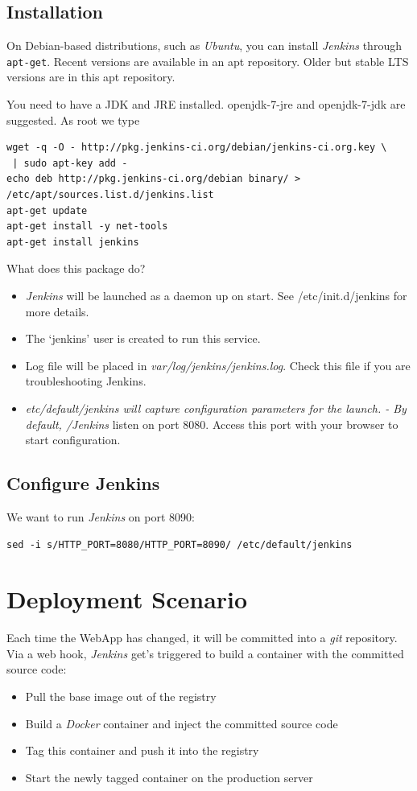 \documentclass[captions=tableheading]{article}
\begin{document}
\subsection{Installation}
\label{sec-5-1}

On Debian-based distributions, such as \emph{Ubuntu}, you can install \emph{Jenkins} through \texttt{apt-get}. Recent versions are available in an apt repository. Older but stable LTS versions are in this apt repository.

You need to have a JDK and JRE installed. openjdk-7-jre and openjdk-7-jdk are suggested. As root we type

\begin{verbatim}
wget -q -O - http://pkg.jenkins-ci.org/debian/jenkins-ci.org.key \
 | sudo apt-key add - 
echo deb http://pkg.jenkins-ci.org/debian binary/ >  /etc/apt/sources.list.d/jenkins.list
apt-get update
apt-get install -y net-tools
apt-get install jenkins
\end{verbatim}

What does this package do?
\begin{itemize}
\item \emph{Jenkins} will be launched as a daemon up on start. See /etc/init.d/jenkins for more details.
\item The `jenkins' user is created to run this service.
\item Log file will be placed in \emph{var/log/jenkins/jenkins.log}. Check this file if you are troubleshooting Jenkins.
\item \emph{etc/default/jenkins will capture configuration parameters for the launch. - By default, /Jenkins} listen on port 8080. Access this port with your browser to start configuration.
\end{itemize}
\subsection{Configure Jenkins}
\label{sec-5-2}

We want to run \emph{Jenkins} on port 8090: 

\begin{verbatim}
sed -i s/HTTP_PORT=8080/HTTP_PORT=8090/ /etc/default/jenkins
\end{verbatim}
\section{Deployment Scenario}
\label{sec-6}

Each time the WebApp has changed, it will be committed into a \emph{git} repository. Via a web hook, \emph{Jenkins} get's triggered to build a container with the committed source code:
\begin{itemize}
\item Pull the base image out of the registry
\item Build a \emph{Docker} container and inject the committed source code
\item Tag this container and push it into the registry
\item Start the newly tagged container on the production server
\end{itemize}
\end{document}
